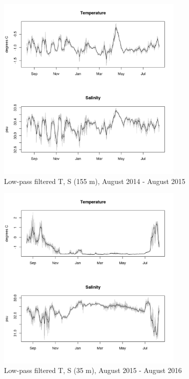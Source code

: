 \documentclass[12pt]{dforeport}
\begin{document}
\begin{figure}  
\centering
\includegraphics[width = 0.8\textwidth]{./figures/31_lpf_TS_155m_2014_2015.png}
\caption[Low-pass filtered T, S (155 m), 2014-2015]{Low-pass filtered T, S (155 m), August 2014 - August 2015}
\label{f:ctd_155_lpf_2014_2015}
\end{figure}


\begin{figure}  
\centering
\includegraphics[width = 0.8\textwidth]{./figures/32_lpf_TS_35m_2015_2016.png}
\caption[Low-pass filtered T, S (35 m), 2015-2016]{Low-pass filtered T, S (35 m), August 2015 - August 2016}
\label{f:ctd_35_lpf_2015_2016}
\end{figure}
\end{document}
